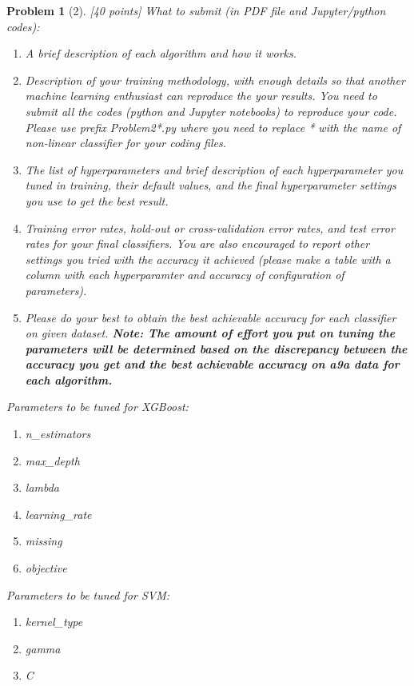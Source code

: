 \documentclass[11pt]{article}
\theoremstyle{quest}
\newtheorem*{problem}{Problem}
\begin{document}
\begin{problem}[2] [40 points]
What to submit (in PDF file and Jupyter/python codes):
\begin{enumerate}
    \item A brief description of each algorithm and how it works.
    \item Description of your training methodology, with enough details so that another machine learning enthusiast can reproduce the your results. You need to submit all the codes (python and Jupyter notebooks) to reproduce your code. Please use prefix \textsf{Problem2*.py} where you need to replace \textsf{*} with the name of non-linear classifier for your coding files.
    \item The list of hyperparameters and brief description of each hyperparameter you tuned in training, their default values, and the final hyperparameter settings you use to get the best result.
    \item Training error rates, hold-out or cross-validation error rates, and test error rates for your final classifiers. You are also encouraged to report other settings you tried with the accuracy it achieved (please make a table with a column with each hyperparamter and accuracy of configuration of parameters).
    \item Please do your best to obtain the best achievable accuracy for each classifier on given dataset. \textbf{Note: The amount of effort you put on tuning the parameters will be determined based on the discrepancy between the accuracy you get and the best achievable accuracy on a9a data for each algorithm.}
\end{enumerate}

Parameters to be tuned for XGBoost:
\begin{enumerate}
    \item \textsf{n\_estimators}
    \item \textsf{max\_depth}
    \item \textsf{lambda}
    \item \textsf{learning\_rate}
    \item \textsf{missing}
    \item \textsf{objective}
\end{enumerate}

Parameters to be tuned for SVM:
\begin{enumerate}
    \item \textsf{kernel\_type}
    \item \textsf{gamma}
    \item \textsf{C}
\end{enumerate}


\end{problem}
\end{document}
